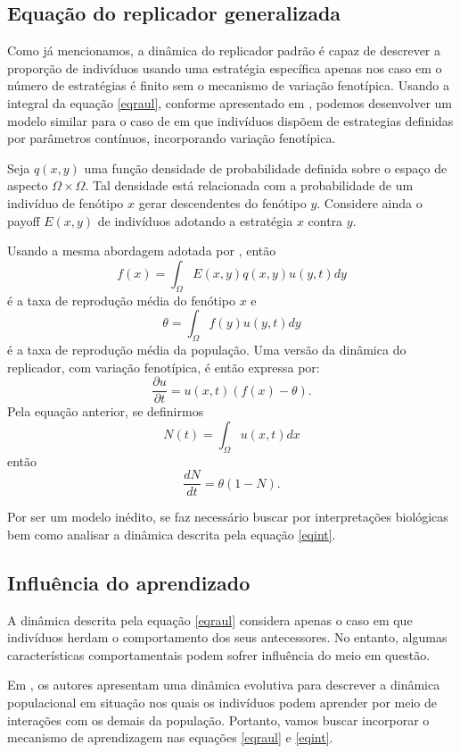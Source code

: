 \documentclass[
	12pt,				%
	openany,			%
	oneoside,			%
	a4paper,			%
	english,			%
	spanish,			%
	brazil,				%
	]{abntex2}
\begin{document}
\subsection{Equação do replicador generalizada}
Como já mencionamos, a dinâmica do replicador padrão é capaz de descrever a proporção de indivíduos usando uma estratégia específica apenas nos caso em o número de estratégias é finito sem o mecanismo de variação fenotípica. Usando a integral da equação \ref{eqraul}, conforme apresentado em \cite{RAAT}, podemos desenvolver um modelo similar para o caso de em que indivíduos dispõem de estrategias definidas por parâmetros contínuos, incorporando variação fenotípica. 

Seja $q(x,y)$ uma função densidade de probabilidade definida sobre o espaço de aspecto $\Omega\times\Omega.$ Tal densidade está relacionada com a probabilidade de um indivíduo de fenótipo $x$ gerar descendentes do fenótipo $y.$ Considere ainda o payoff $E(x,y)$ de indivíduos adotando a estratégia $x$ contra $y$. 

Usando a mesma abordagem adotada por \cite{Taylor1978145}, então $$f(x)=\int_{\Omega}E(x,y)q(x,y)u(y,t)dy$$ é a taxa de reprodução média do fenótipo $x$ e $$\theta=\int_{\Omega}f(y)u(y,t)dy$$ é a taxa de reprodução média da população. Uma versão da dinâmica do replicador, com variação fenotípica, é então expressa por:
\begin{equation}\label{eqint}
\frac{\partial u}{\partial t}=u(x,t)\left(f(x)-\theta\right).
\end{equation} 
Pela equação anterior, se definirmos $$N(t)=\int_{\Omega}u(x,t)dx$$ então 
$$\frac{dN}{dt}=\theta(1-N).$$

Por ser um modelo inédito, se faz necessário buscar por interpretações biológicas bem como analisar a dinâmica descrita pela equação \ref{eqint}.

\subsection{Influência do aprendizado}
A dinâmica descrita pela equação \ref{eqraul} considera apenas o caso em que indivíduos herdam o comportamento dos seus antecessores. No entanto, algumas características comportamentais  podem sofrer influência do meio em questão.  

Em \cite{JTB}, os autores apresentam uma dinâmica evolutiva para descrever a dinâmica populacional em situação nos quais os indivíduos podem aprender por meio de interações com os demais da população. Portanto, vamos buscar incorporar o mecanismo de aprendizagem nas equações \ref{eqraul} e \ref{eqint}. 
\end{document}
